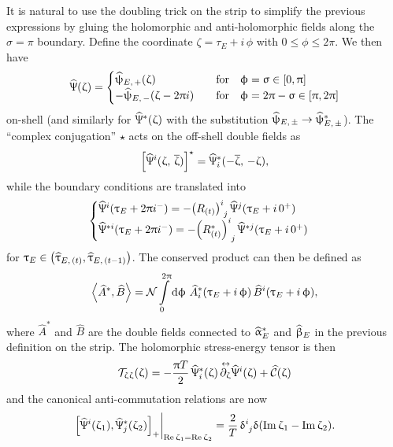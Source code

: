 It is natural to use the doubling trick on the strip to simplify the previous expressions by gluing the holomorphic and anti-holomorphic fields along the $\sigma = \pi$ boundary.
Define the coordinate $\zeta = \tau_E + i\, \phi$ with $0 \le \phi \le 2\pi$.
We then have
\begin{equation}
  \hPsi( \zeta )
  =
  \begin{cases}
    \hpsi_{E,\, +}(\zeta)
    &
    \qfor
    \phi = \sigma \in \qty[ 0, \pi ]
    \\
    -\hpsi_{E,\, -}(\zeta - 2 \pi i)
    &
    \qfor
    \phi = 2\pi - \sigma \in \qty[ \pi, 2 \pi ]
  \end{cases}
\end{equation}
on-shell (and similarly for $\widehat{\Uppsi}^*( \upzeta )$ with the substitution $\widehat{\uppsi}_{E,\, \pm} \to \widehat{\uppsi}_{E,\, \pm}^*$).
The ``complex conjugation'' $\star$ acts on the off-shell double fields as
\begin{equation}
  \qty[ \widehat{\Uppsi}^i(\upzeta,\, \overline{\upzeta}) ]^\star = \widehat{\Uppsi}_i^*(-\overline{\upzeta},\, -\upzeta),
\end{equation}
while the boundary conditions are translated into
\begin{equation}
  \begin{cases}
    \hPsi^i( \tau_E + 2 \pi i^- )
    =
    -\tensor{\qty( R_{(t)} )}{^i_j}\,
    \hPsi^j( \tau_E + i\, 0^+ )
    \\
    \hPsi^{* i}( \tau_E + 2 \pi i^- )
    =
    -\tensor{\qty( R_{(t)}^* )}{^i_j}\,
    \hPsi^{* j}( \tau_E + i\, 0^+ )
  \end{cases}
\end{equation}
for $\uptau_E \in \qty( \widehat{\uptau}_{E,\, (t)}, \widehat{\uptau}_{E,\, (t-1)} )$.
The conserved product can then be defined as
\begin{equation}
  \left\langle \widehat{A}^*, \widehat{B} \right\rangle
  =
  \mathcal{N}
  \int\limits_{0}^{2\uppi} \dd{\ensuremath{\upphi}}\,
  \widehat{A}^*_i(\uptau_E + i\, \upphi )\,
  \widehat{B}^i( \uptau_E + i\, \upphi ),
\end{equation}
where $\widehat{A}^*$ and $\widehat{B}$ are the double fields connected to $\widehat{\upalpha}^*_E$ and $\widehat{\upbeta}_E$ in the previous definition on the strip.
The holomorphic stress-energy tensor is then
\begin{equation}
  \mathcal{T}_{\upzeta \upzeta}( \upzeta )
  =
  - \frac{\uppi T}{2}\,
  \widehat{\Uppsi}_{i}^*( \upzeta )\, \overset{\leftrightarrow}{\partial_{\upzeta}} \widehat{\Uppsi}^i( \upzeta ) 
  +
  \widehat{\mathcal{C}}(\upzeta)
\end{equation}
and the canonical anti-commutation relations are now
\begin{equation}
  \eval{
    \qty[
      \hPsi^i( \zeta_1 )
      ,
      \hPsi_{j}^*( \zeta_2 )
    ]_+
  }_{\Re\zeta_1 = \Re\zeta_2}
  =
  \frac{2}{T}\, \tensor{\delta}{^i_j} \delta\qty( \Im\zeta_1 - \Im\zeta_2 ).
\end{equation}


